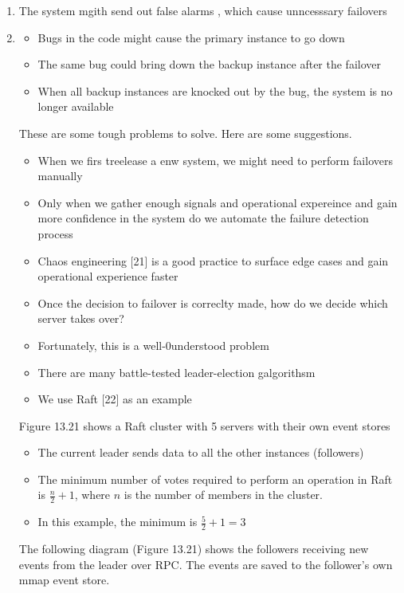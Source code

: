 \documentclass{report}
\theoremstyle{definition}
\begin{document}
\begin{enumerate}
\item
The system mgith send out false alarms , which cause unncesssary failovers
\item

\begin{itemize}
\item
Bugs in the code might cause the primary instance to go down
\item
The same bug could bring down the backup instance after the failover
\item
When all backup instances are knocked out by the bug, the system is no longer available
\end{itemize}

These are some tough problems to solve. Here are some suggestions.

\begin{itemize}
\item
When we firs treelease a enw system, we might need to perform failovers manually
\item
Only when we gather enough signals and operational expereince and gain more confidence in the system do we automate the failure detection process
\item
Chaos engineering [21] is a good practice to surface edge cases and gain operational experience faster
\item
Once the decision to failover is correclty made, how do we decide which server takes over?
\item
Fortunately, this is a well-0understood problem
\item
There are many battle-tested leader-election galgorithsm
\item
We use Raft [22] as an example
\end{itemize}

Figure 13.21 shows a Raft cluster with 5 servers with their own event stores

\begin{itemize}
\item
The current leader sends data to all the other instances (followers)
\item
The minimum number of votes required to perform an operation in Raft is $\frac{n}{2} + 1$, where $n$ is the number of members in the cluster.
\item
In this example, the minimum is $\frac{5}{2} + 1 = 3$
\end{itemize}

The following diagram (Figure 13.21) shows the followers receiving new events from the leader over RPC. The events are saved to the follower's own mmap event store.
\end{enumerate}
\end{document}
